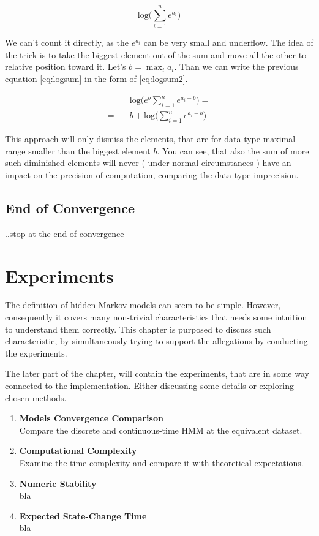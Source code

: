 \documentclass[thesis=M,english]{FITthesis}[2012/10/20]
\begin{document}
\begin{equation}\label{eq:logsum}
\mathrm{log} \big( \sum_{i=1}^n e^{a_i} \big)
\end{equation}

We can't count it directly, as the $e^{a_i}$ can be very small and underflow. The idea of the trick is to take the biggest element out of the sum and move all the other to relative position toward it.
Let's $b = \max_{i} a_i$. Than we can write the previous equation \eqref{eq:logsum} in the form of \eqref{eq:logsum2}. 

\begin{equation}\label{eq:logsum2}
\begin{aligned}
&\mathrm{log} \big( e^b \sum_{i=1}^n e^{a_i - b } \big) = \\
 = \quad &  b + \mathrm{log} \big( \sum_{i=1}^n e^{a_i - b } \big)
\end{aligned}
\end{equation}

This approach will only dismiss the elements, that are for data-type maximal-range smaller than the biggest element $b$. You can see, that also the sum of more such diminished elements will never ( under normal circumstances ) have an impact on the precision of computation, comparing the data-type imprecision.     

\section{End of Convergence}
..stop at the end of convergence

\chapter{Experiments}

The definition of hidden Markov models can seem to be simple. However, consequently it covers many non-trivial characteristics that needs some intuition to understand them correctly. This chapter is purposed to discuss such characteristic, by simultaneously trying to support the allegations by conducting the experiments.

The later part of the chapter, will contain the experiments, that are in some way connected to the implementation. Either discussing some details or exploring chosen methods.       

\begin{enumerate}[resume]
\setcounter{enumi}{0}
\item \textbf{Models Convergence Comparison} \\
Compare the discrete and continuous-time HMM at the equivalent dataset.
\item \textbf{Computational Complexity} \\
Examine the time complexity and compare it with theoretical expectations.
\item \textbf{Numeric Stability} \\
bla
\item \textbf{Expected State-Change Time} \\
bla

\end{enumerate}
\end{document}
